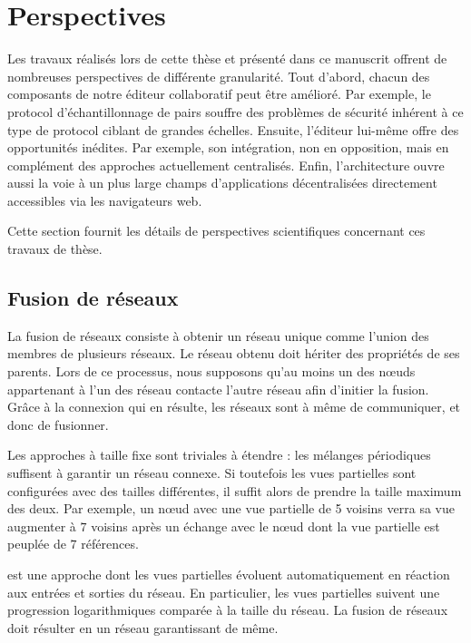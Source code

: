 
\section{Perspectives}

Les travaux réalisés lors de cette thèse et présenté dans ce manuscrit offrent
de nombreuses perspectives de différente granularité. Tout d'abord, chacun des
composants de notre éditeur collaboratif peut être amélioré. Par exemple, le
protocol d'échantillonnage de pairs \SPRAY souffre des problèmes de sécurité
inhérent à ce type de protocol ciblant de grandes échelles. Ensuite, l'éditeur
lui-même offre des opportunités inédites. Par exemple, son intégration, non en
opposition, mais en complément des approches actuellement centralisés. Enfin,
l'architecture ouvre aussi la voie à un plus large champs d'applications
décentralisées directement accessibles via les navigateurs web.

Cette section fournit les détails de perspectives scientifiques concernant ces
travaux de thèse.

\subsection{Fusion de réseaux}

\label{net:sec:merging}

La fusion de réseaux consiste à obtenir un réseau unique comme l'union des
membres de plusieurs réseaux. Le réseau obtenu doit hériter des propriétés de
ses parents.  Lors de ce processus, nous supposons qu'au moins un des nœuds
appartenant à l'un des réseau contacte l'autre réseau afin d'initier la
fusion. Grâce à la connexion qui en résulte, les réseaux sont à même de
communiquer, et donc de fusionner.

Les approches à taille fixe sont triviales à étendre : les mélanges périodiques
suffisent à garantir un réseau connexe. Si toutefois les vues partielles sont
configurées avec des tailles différentes, il suffit alors de prendre la taille
maximum des deux. Par exemple, un nœud avec une vue partielle de 5 voisins verra
sa vue augmenter à $7$ voisins après un échange avec le nœud dont la vue
partielle est peuplée de $7$ références.

\SPRAY est une approche dont les vues partielles évoluent automatiquement en
réaction aux entrées et sorties du réseau. En particulier, les vues partielles
suivent une progression logarithmiques comparée à la taille du réseau. La fusion
de réseaux \SPRAY doit résulter en un réseau \SPRAY garantissant de même.

